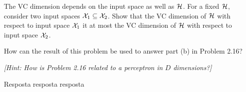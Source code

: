 \begin{enunciado}{17}
    The VC dimension depends on the input space as well as $\mathcal{H}$. For a fixed $\mathcal{H}$, consider two input spaces $\mathcal{X}_1 \subseteq \mathcal{X}_2$. Show that the VC dimension of $\mathcal{H}$ with respect to input space $\mathcal{X}_1$ it at most the VC dimension of $\mathcal{H}$ with respect to input space $\mathcal{X}_2$.
    
    How can the result of this problem be used to answer part (b) in Problem 2.16?
    
    \textit{[Hint: How is Problem 2.16 related to a perceptron in $D$ dimensions?]}
\end{enunciado}

Resposta resposta resposta